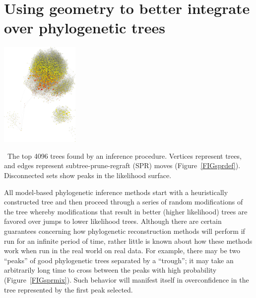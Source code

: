 \documentclass[hyper]{tufte-handout}
\begin{document}
\section{Using geometry to better integrate over phylogenetic trees}
\begin{marginfigure}%
  \includegraphics[width=1.5in]{ds6_small.png}
  \caption{\
    The top 4096 trees found by an inference procedure.
    Vertices represent trees, and edges represent subtree-prune-regraft (SPR) moves (Figure~\ref{FIGsprdef}).
    Disconnected sets show peaks in the likelihood surface.
    }
  \label{FIGsprmix}
\end{marginfigure}
All model-based phylogenetic inference methods start with a heuristically constructed tree and then proceed through a series of random modifications of the tree whereby modifications that result in better (higher likelihood) trees are favored over jumps to lower likelihood trees.
Although there are certain guarantees concerning how phylogenetic reconstruction methods will perform if run for an infinite period of time, rather little is known about how these methods work when run in the real world on real data.
For example, there may be two ``peaks'' of good phylogenetic trees separated by a ``trough''; it may take an arbitrarily long time to cross between the peaks with high probability (Figure~\ref{FIGsprmix}).
Such behavior will manifest itself in overconfidence in the tree represented by the first peak selected.
\end{document}
